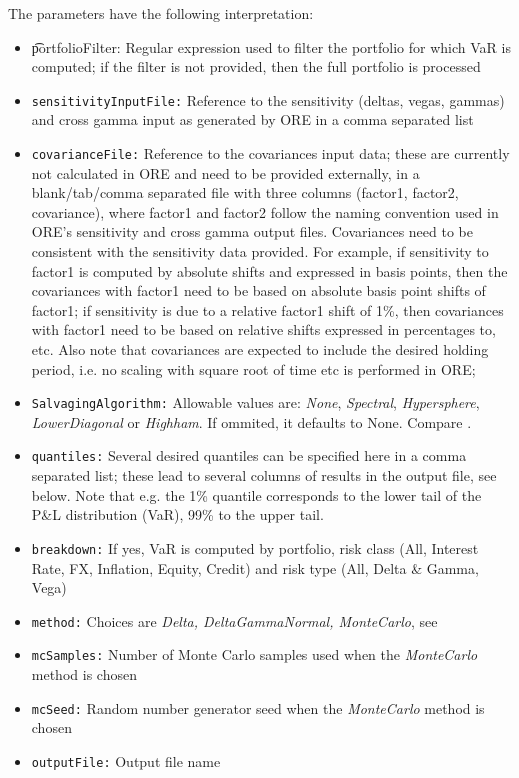 {The parameters have the following interpretation:

\begin{itemize}
\item {\t portfolioFilter:} Regular expression used to filter the portfolio for which VaR is computed; if the filter is not provided, then the full portfolio is processed
\item {\tt sensitivityInputFile:} Reference to the sensitivity (deltas, vegas, gammas) and cross gamma input as generated by ORE in a comma separated list
\item {\tt covarianceFile:} Reference to the covariances input data; these are currently not calculated in ORE and need to be provided externally, in a blank/tab/comma separated file with three columns (factor1, factor2, covariance), where factor1 and factor2 follow the naming convention used in ORE's sensitivity and cross gamma output files. Covariances need to be consistent with the sensitivity data provided. For example, if sensitivity to factor1 is computed by absolute shifts and expressed in basis points, then the covariances with factor1 need to be based on absolute basis point shifts of factor1; if sensitivity is due to a relative factor1 shift of 1\%, then covariances with factor1 need to be based on relative shifts expressed in percentages to, etc. Also note that covariances are expected to include the desired holding period, i.e. no scaling with square root of time etc is performed in ORE; 
\item {\tt SalvagingAlgorithm:} Allowable values are: {\em None}, {\em Spectral}, {\em Hypersphere}, {\em LowerDiagonal} or {\em Highham}. If ommited, it defaults to None. Compare \cite{corrSalv}.
\item {\tt quantiles:} Several desired quantiles can be specified here in a comma separated list; these lead to several columns of results in the output file, see below. Note that e.g. the 1\% quantile corresponds to the lower tail of the P\&L distribution (VaR), 99\% to the upper tail.
\item {\tt breakdown:} If yes, VaR is computed by portfolio, risk class (All, Interest Rate, FX, Inflation, Equity, Credit) and risk type (All, Delta \& Gamma, Vega)
\item {\tt method:} Choices are {\em Delta, DeltaGammaNormal, MonteCarlo}, see \cite{methods}
\item {\tt mcSamples:} Number of Monte Carlo samples used when the {\em MonteCarlo} method is chosen 
\item {\tt mcSeed:} Random number generator seed when the {\em MonteCarlo} method is chosen
\item {\tt outputFile:} Output file name
\end{itemize}

}
